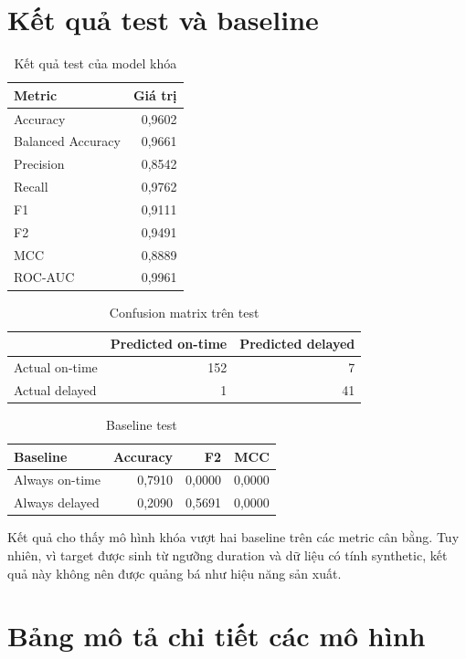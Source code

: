 \documentclass[12pt,a4paper,oneside]{report}
\begin{document}
\section{Kết quả test và baseline}

\begin{table}[H]
\centering
\caption{Kết quả test của model khóa}
\begin{tabular}{lr}
\toprule
Metric & Giá trị\\
\midrule
Accuracy & 0,9602\\
Balanced Accuracy & 0,9661\\
Precision & 0,8542\\
Recall & 0,9762\\
F1 & 0,9111\\
F2 & 0,9491\\
MCC & 0,8889\\
ROC-AUC & 0,9961\\
\bottomrule
\end{tabular}
\end{table}

\begin{table}[H]
\centering
\caption{Confusion matrix trên test}
\begin{tabular}{lrr}
\toprule
 & Predicted on-time & Predicted delayed\\
\midrule
Actual on-time & 152 & 7\\
Actual delayed & 1 & 41\\
\bottomrule
\end{tabular}
\end{table}

\begin{table}[H]
\centering
\caption{Baseline test}
\begin{tabular}{lrrr}
\toprule
Baseline & Accuracy & F2 & MCC\\
\midrule
Always on-time & 0,7910 & 0,0000 & 0,0000\\
Always delayed & 0,2090 & 0,5691 & 0,0000\\
\bottomrule
\end{tabular}
\end{table}

Kết quả cho thấy mô hình khóa vượt hai baseline trên các metric cân bằng. Tuy
nhiên, vì target được sinh từ ngưỡng duration và dữ liệu có tính synthetic, kết
quả này không nên được quảng bá như hiệu năng sản xuất.

\section{Bảng mô tả chi tiết các mô hình}
\end{document}
